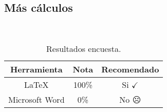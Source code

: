 \begin{appendixd}
	\section{Más cálculos}

	\lipsum[1] \\
	
	\lipsum[4]

	\begin{table}[H]
		\centering
		\caption{Resultados encuesta.}
		\begin{tabular}{ccc}
			\hline
			\textbf{Herramienta} & \textbf{Nota} & \textbf{Recomendado} \bigstrut\\
			\hline
			\LaTeX & 100\% & Si $\checkmark$ \\
			Microsoft Word \textsuperscript{\textregistered} & 0\% & No $\frownie$\\
			\hline
		\end{tabular}
		\label{tab:anexo-2}
	\end{table}

\end{appendixd}